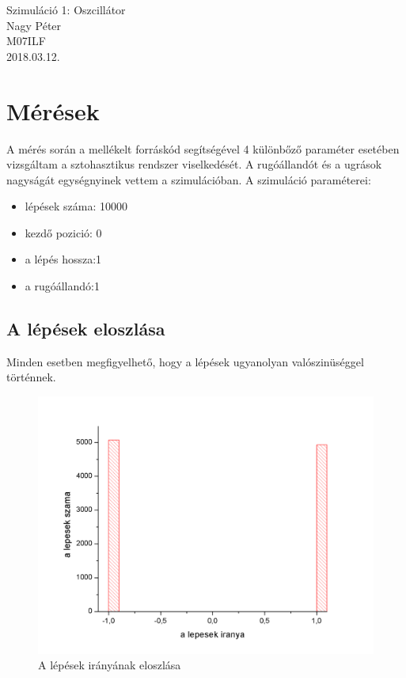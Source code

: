 \documentclass[paper=a4, fontsize=11pt]{article}
\begin{document}
\begingroup
	\centering
	\LARGE Szimuláció 1: Oszcillátor\\
\vspace{1 cm}
\large Nagy Péter\\
\large M07ILF\\
\vfill
\large 2018.03.12.\\

\newpage

\tableofcontents
\newpage


\section{Mérések}
A mérés során a mellékelt forráskód segítségével 4 különbőző paraméter esetében vizsgáltam a sztohasztikus rendszer viselkedését. A rugóállandót és a ugrások nagyságát egységnyinek vettem a szimulációban.
\newline
\flushleft
 A szimuláció paraméterei:

\begin{itemize}
  \item lépések száma: 10000
\item kezdő pozició: 0
\item a lépés hossza:1
\item a rugóállandó:1
\end{itemize}
  

\subsection{A lépések eloszlása}
Minden esetben megfigyelhető, hogy a lépések ugyanolyan valószinüséggel történnek.

\begin{figure}[h]
\includegraphics[width=\textwidth]{lep.png}
\caption{A lépések irányának eloszlása}
\end{figure}
\end{document}
